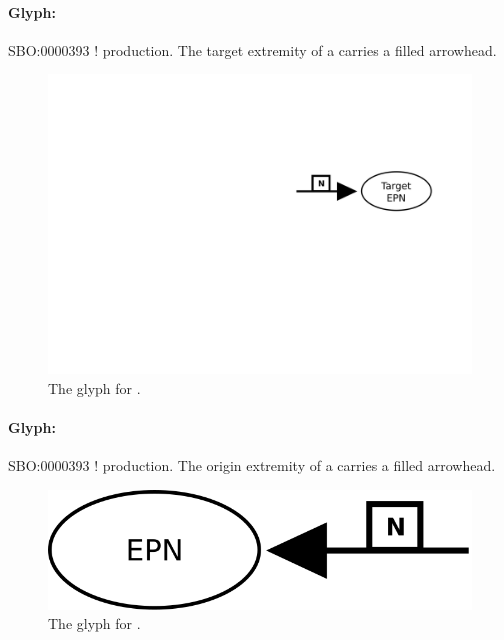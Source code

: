 \paragraph{Glyph: }\label{sec:techref:production}

\begin{glyphDescription}
 \glyphSboTerm SBO:0000393 ! production.
 \glyphEndPoint The target extremity of a  carries a filled arrowhead.
 \end{glyphDescription}

\begin{figure}[htb]
  \centering
  \includegraphics[scale = 0.4]{images/production}
  \caption{The \PD glyph for .}
  \label{fig:techref:production}
\end{figure}

\paragraph{Glyph: }\label{sec:techref:reversible}

\begin{glyphDescription}
 \glyphSboTerm SBO:0000393 ! production.
 \glyphEndPoint The origin extremity of a  carries a filled arrowhead.
 \end{glyphDescription}

\begin{figure}[htb]
  \centering
  \includegraphics[scale = 0.4]{images/reversible}
  \caption{The \PD glyph for .}
  \label{fig:techref:reversible}
\end{figure}


